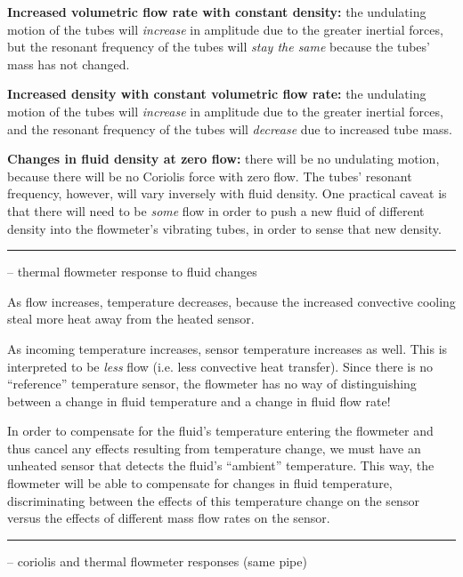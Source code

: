 {\bf Increased volumetric flow rate with constant density:} the undulating motion of the tubes will {\it increase} in amplitude due to the greater inertial forces, but the resonant frequency of the tubes will {\it stay the same} because the tubes' mass has not changed.

\vskip 10pt

{\bf Increased density with constant volumetric flow rate:} the undulating motion of the tubes will {\it increase} in amplitude due to the greater inertial forces, and the resonant frequency of the tubes will {\it decrease} due to increased tube mass.

\vskip 10pt

{\bf Changes in fluid density at zero flow:} there will be no undulating motion, because there will be no Coriolis force with zero flow.  The tubes' resonant frequency, however, will vary inversely with fluid density.  One practical caveat is that there will need to be {\it some} flow in order to push a new fluid of different density into the flowmeter's vibrating tubes, in order to sense that new density.


\filbreak \vskip 5pt \hrule \vskip 5pt  -- thermal flowmeter response to fluid changes \vskip 10pt

As flow increases, temperature decreases, because the increased convective cooling steal more heat away from the heated sensor.

\vskip 10pt

As incoming temperature increases, sensor temperature increases as well.  This is interpreted to be {\it less} flow (i.e. less convective heat transfer).  Since there is no ``reference'' temperature sensor, the flowmeter has no way of distinguishing between a change in fluid temperature and a change in fluid flow rate!

\vskip 10pt

In order to compensate for the fluid's temperature entering the flowmeter and thus cancel any effects resulting from temperature change, we must have an unheated sensor that detects the fluid's ``ambient'' temperature.  This way, the flowmeter will be able to compensate for changes in fluid temperature, discriminating between the effects of this temperature change on the sensor versus the effects of different mass flow rates on the sensor.


\filbreak \vskip 5pt \hrule \vskip 5pt  -- coriolis and thermal flowmeter responses (same pipe) \vskip 10pt

